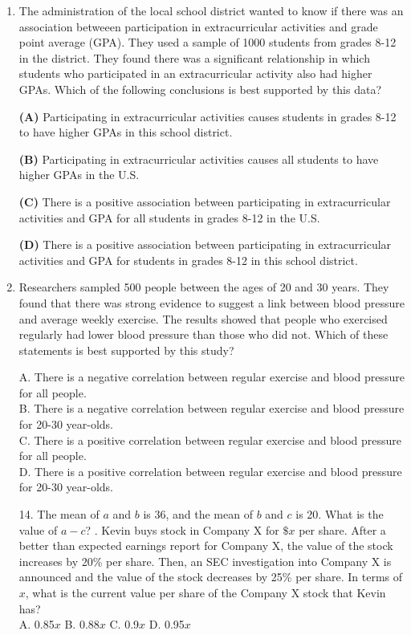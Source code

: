 \documentclass[../satmath.tex]{subfiles}
\begin{document}
\begin{enumerate}[label=\bfseries\arabic*.]
\item The administration of the local school district wanted to know if there was an association betweeen participation in extracurricular activities and 
grade point average (GPA). They used a sample of 1000 students from grades 8-12 in the district. They found there was a significant relationship in which 
students who participated in an extracurricular activity also had higher GPAs. Which of the following conclusions is best supported by this data?

\textbf{(A) } Participating in extracurricular activities causes students in grades 8-12 to have higher GPAs in this school district.

\textbf{(B) } Participating in extracurricular activities causes all students to have higher GPAs in the U.S.

\textbf{(C) } There is a positive association between participating in extracurricular activities and GPA for all students in grades 8-12 in the U.S.

\textbf{(D) } There is a positive association between participating in extracurricular activities and GPA for students in grades 8-12 in this school district. 

\item Researchers sampled 500 people between the ages of 20 and 30 years. They found that there was strong evidence to suggest a link between blood 
pressure and average weekly exercise. The results showed that people who exercised regularly had lower blood pressure than those who did not. Which of these 
statements is best supported by this study?

A. There is a negative correlation between regular exercise and blood pressure for all people.\\
B. There is a negative correlation between regular exercise and blood pressure for 20-30 year-olds.\\
C. There is a positive correlation between regular exercise and blood pressure for all people.\\
D. There is a positive correlation between regular exercise and blood pressure for 20-30 year-olds.
\medbreak 

14. The mean of $a$ and $b$ is 36, and the mean of $b$ and $c$ is 20. What is the value of $a-c$?
. Kevin buys stock in Company X for $\$x$ per share. After a better than expected earnings report for Company X, the value of the stock 
increases by 20\% per share. Then, an SEC investigation into Company X is announced and the value of the stock decreases by 25\% per share. 
In terms of $x$, what is the current value per share of the Company X stock that Kevin has?\\
A. 0.85$x$ \quad B. 0.88$x$ \quad C. 0.9$x$ \quad D. 0.95$x$
\medbreak 


\end{enumerate}
\end{document}
